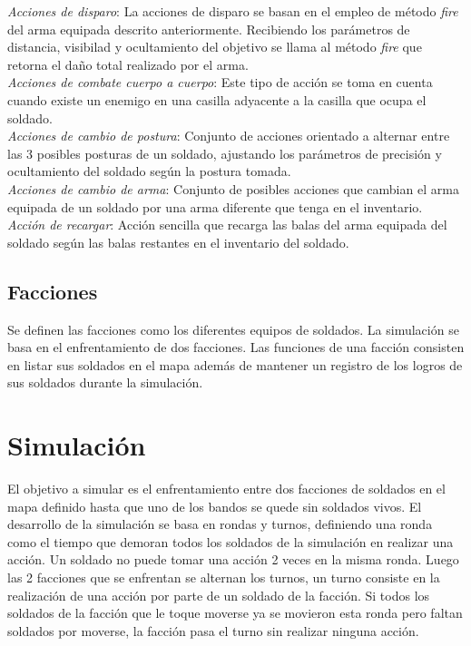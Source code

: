 \documentclass[twoside]{article}
\begin{document}
		\emph{Acciones de disparo}: La acciones de disparo se basan en el empleo de m\'etodo \emph{fire} del arma equipada descrito anteriormente. Recibiendo los par\'ametros de distancia, visibilad y ocultamiento del objetivo se llama al m\'etodo \emph{fire} que retorna el da\~no total realizado por el arma.\\
		\emph{Acciones de combate cuerpo a cuerpo}: Este tipo de acci\'on se toma en cuenta cuando existe un enemigo en una casilla adyacente a la casilla que ocupa el soldado.\\
		
		\emph{Acciones de cambio de postura}: Conjunto de acciones orientado a alternar entre las 3 posibles posturas de un soldado, ajustando los par\'ametros de precisi\'on y ocultamiento del soldado seg\'un la postura tomada.\\
		
		\emph{Acciones de cambio de arma}: Conjunto de posibles acciones que cambian el arma equipada de un soldado por una arma diferente que tenga en el inventario.\\
		
		\emph{Acci\'on de recargar}: Acci\'on sencilla que recarga las balas del arma equipada del soldado seg\'un las balas restantes en el inventario del soldado.
		
		\section{Facciones}
		
		Se definen las facciones como los diferentes equipos de soldados. La simulaci\'on se basa en el enfrentamiento de dos facciones. Las funciones de una facci\'on consisten en listar sus soldados en el mapa adem\'as de mantener un registro de los logros de sus soldados durante la simulaci\'on.
		
		
		\chapter{Simulaci\'on}
		
		El objetivo a simular es el enfrentamiento entre dos facciones de soldados en el mapa definido hasta que uno de los bandos se quede sin soldados vivos. El desarrollo de la simulaci\'on se basa en rondas y turnos, definiendo una ronda como el tiempo que demoran todos los soldados de la simulaci\'on en realizar una acci\'on. Un soldado no puede tomar una acci\'on 2 veces en la misma ronda. Luego las 2 facciones que se enfrentan se alternan los turnos, un turno consiste en la realizaci\'on de una acci\'on por parte de un soldado de la facci\'on. Si todos los soldados de la facci\'on que le toque moverse ya se movieron esta ronda pero faltan soldados por moverse, la facci\'on pasa el turno sin realizar ninguna acci\'on.
		
\end{document}
